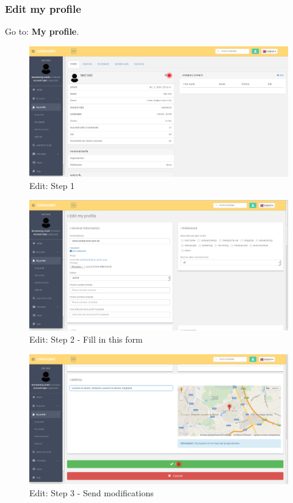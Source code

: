\documentclass{article}
\begin{document}
\clearpage
\subsubsection{Edit my profile}
Go to: \textbf{My profile}.
\begin{figure}[!ht]
   \includegraphics[width=\textwidth]{img/profil4.png}
   \caption{Edit: Step 1}
\end{figure}
\begin{figure}[!ht]
   \includegraphics[width=\textwidth]{img/profil5.png}
   \caption{Edit: Step 2 - Fill in this form}
\end{figure}
\begin{figure}[!ht]
   \includegraphics[width=\textwidth]{img/profil6.png}
   \caption{Edit: Step 3 - Send modifications}
\end{figure}
\end{document}
